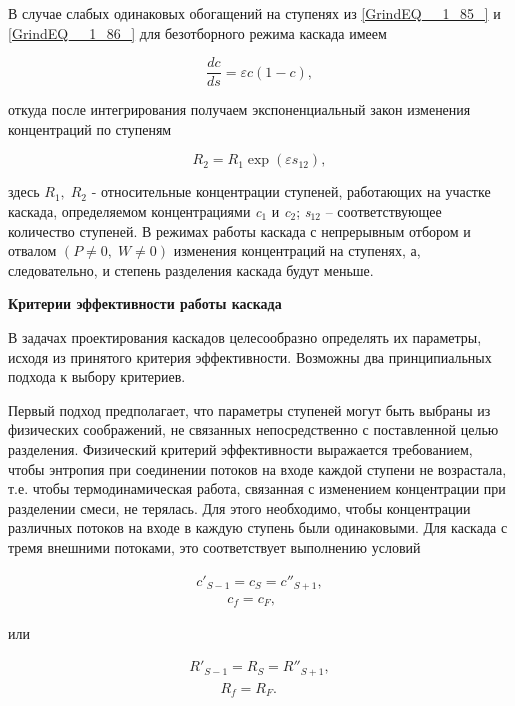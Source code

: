 В случае слабых одинаковых обогащений на ступенях из \ref{GrindEQ__1_85_} и \ref{GrindEQ__1_86_} для безотборного режима каскада имеем

\begin{equation} \label{GrindEQ__1_92_} 
\frac{dc}{ds} =\varepsilon c(1-c),    
\end{equation} 

откуда после интегрирования получаем экспоненциальный закон изменения концентраций по ступеням

\begin{equation} \label{GrindEQ__1_93_} 
R_{2} =R_{1} \exp (\varepsilon s_{12} ),   
\end{equation} 

здесь $R_{1} ,\; R_{2} $ - относительные концентрации ступеней, работающих на участке каскада, определяемом концентрациями \textit{c}${}_{1}$ и \textit{c}${}_{2}$; \textit{s}${}_{12}$ -- соответствующее количество ступеней. В режимах работы каскада с непрерывным отбором и отвалом $(P\ne 0,\; W\ne 0)$ изменения концентраций на ступенях, а, следовательно, и степень разделения каскада будут меньше.

\textbf{Критерии эффективности работы каскада}

В задачах проектирования каскадов целесообразно определять их параметры, исходя из принятого критерия эффективности. Возможны два принципиальных подхода к выбору критериев.

Первый подход предполагает, что параметры ступеней могут быть выбраны из физических соображений, не связанных непосредственно с поставленной целью разделения. Физический критерий эффективности выражается требованием, чтобы энтропия при соединении потоков на входе каждой ступени не возрастала, т.е. чтобы термодинамическая работа, связанная с изменением концентрации при разделении смеси, не терялась. Для этого необходимо, чтобы концентрации различных потоков на входе в каждую ступень были одинаковыми. Для каскада с тремя внешними потоками, это соответствует выполнению условий

\begin{equation} \label{GrindEQ__1_94_} 
\begin{array}{l} {c'_{S-1} =c_{S} =c''_{S+1} ,} \\ {\; \; \; \; \; \; \; \; c_{f} =c_{F} ,} \end{array} 
\end{equation} 

или

\begin{equation} \label{GrindEQ__1_95_} 
\begin{array}{l} {R'_{S-1} =R_{S} =R''_{S+1} ,} \\ {\; \; \; \; \; \; \; \; R_{f} =R_{F} .} \end{array}
\end{equation} 

